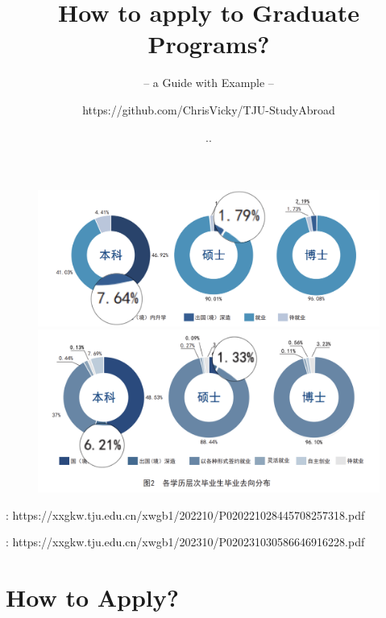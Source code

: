\documentclass[UTF8]{beamer}
\author{https://github.com/ChrisVicky/TJU-StudyAbroad}
\title{How to apply to Graduate Programs?}
\subtitle{-- a Guide with Example --}
\institute{College of Intelligence and Computing}
\date{\tiny \the\year.\the\month.\the\day}
\begin{document}
\begin{frame}
  \titlepage
\end{frame}


\begin{frame}
\begin{figure}
  \centering
  \tiny
  \includegraphics[width=.7\linewidth]{pic/2021-SA.png}
  \includegraphics[width=.7\linewidth]{pic/2022-SA.png}
\end{figure}
{\tiny {}: https://xxgkw.tju.edu.cn/xwgb1/202210/P020221028445708257318.pdf}

{\tiny {}: https://xxgkw.tju.edu.cn/xwgb1/202310/P020231030586646916228.pdf}
\end{frame}


\begin{frame}
  \tableofcontents[sectionstyle=show,subsectionstyle=show/shaded/hide,subsubsectionstyle=show/shaded/hide]
\end{frame}



\section{How to Apply?}
\end{document}

